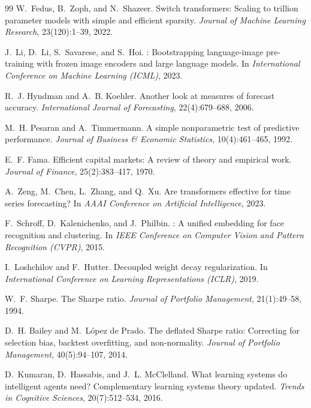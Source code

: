 \documentclass{article}
\begin{document}
\begin{thebibliography}{99}
W.~Fedus, B.~Zoph, and N.~Shazeer.
\newblock Switch transformers: Scaling to trillion parameter models with simple and efficient sparsity.
\newblock \emph{Journal of Machine Learning Research}, 23(120):1--39, 2022.

J.~Li, D.~Li, S.~Savarese, and S.~Hoi.
: Bootstrapping language-image pre-training with frozen image encoders and large language models.
\newblock In \emph{International Conference on Machine Learning (ICML)}, 2023.

R.~J. Hyndman and A.~B. Koehler.
\newblock Another look at measures of forecast accuracy.
\newblock \emph{International Journal of Forecasting}, 22(4):679--688, 2006.

M.~H. Pesaran and A.~Timmermann.
\newblock A simple nonparametric test of predictive performance.
\newblock \emph{Journal of Business \& Economic Statistics}, 10(4):461--465, 1992.

E.~F. Fama.
\newblock Efficient capital markets: A review of theory and empirical work.
\newblock \emph{Journal of Finance}, 25(2):383--417, 1970.

A.~Zeng, M.~Chen, L.~Zhang, and Q.~Xu.
\newblock Are transformers effective for time series forecasting?
\newblock In \emph{AAAI Conference on Artificial Intelligence}, 2023.

F.~Schroff, D.~Kalenichenko, and J.~Philbin.
: A unified embedding for face recognition and clustering.
\newblock In \emph{IEEE Conference on Computer Vision and Pattern Recognition (CVPR)}, 2015.

I.~Loshchilov and F.~Hutter.
\newblock Decoupled weight decay regularization.
\newblock In \emph{International Conference on Learning Representations (ICLR)}, 2019.

W.~F. Sharpe.
\newblock The {Sharpe} ratio.
\newblock \emph{Journal of Portfolio Management}, 21(1):49--58, 1994.

D.~H. Bailey and M.~L{\'o}pez de Prado.
\newblock The deflated {Sharpe} ratio: Correcting for selection bias, backtest overfitting, and non-normality.
\newblock \emph{Journal of Portfolio Management}, 40(5):94--107, 2014.

D.~Kumaran, D.~Hassabis, and J.~L. McClelland.
\newblock What learning systems do intelligent agents need? {C}omplementary learning systems theory updated.
\newblock \emph{Trends in Cognitive Sciences}, 20(7):512--534, 2016.


\end{thebibliography}
\end{document}
